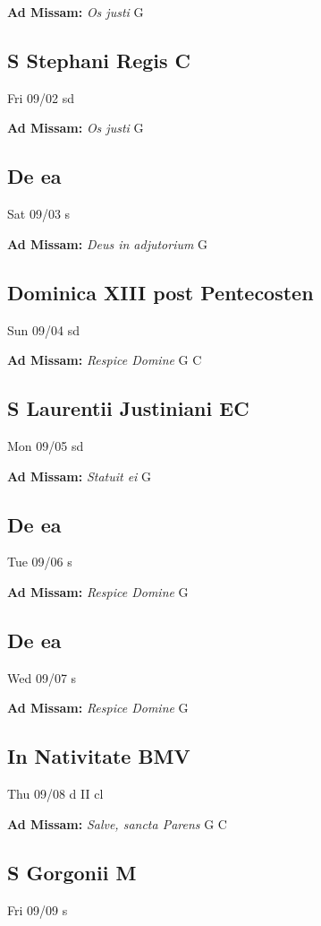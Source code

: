 \documentclass[letterpaper, 10pt, twocolumn]{article}
\begin{document}
\textbf{Ad Missam:} \textit{Os justi} G 

\subsection*{S Stephani Regis C}Fri 09/02 sd

\textbf{Ad Missam:} \textit{Os justi} G 

\subsection*{De ea}Sat 09/03 s

\textbf{Ad Missam:} \textit{Deus in adjutorium} G 

\subsection*{Dominica XIII post Pentecosten}Sun 09/04 sd

\textbf{Ad Missam:} \textit{Respice Domine} G C 

\subsection*{S Laurentii Justiniani EC}Mon 09/05 sd

\textbf{Ad Missam:} \textit{Statuit ei} G 

\subsection*{De ea}Tue 09/06 s

\textbf{Ad Missam:} \textit{Respice Domine} G 

\subsection*{De ea}Wed 09/07 s

\textbf{Ad Missam:} \textit{Respice Domine} G 

\subsection*{In Nativitate BMV}Thu 09/08 d II cl

\textbf{Ad Missam:} \textit{Salve, sancta Parens} G C 

\subsection*{S Gorgonii M}Fri 09/09 s
\end{document}
